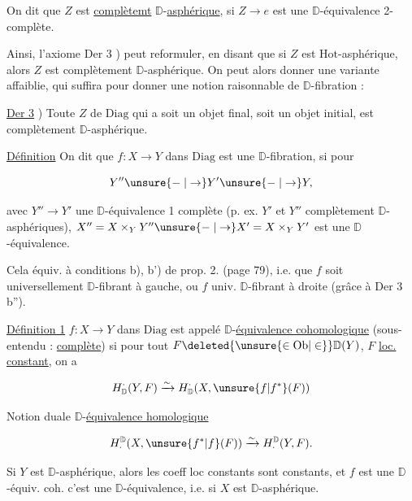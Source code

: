 
On dit que $Z$ est \uline{complètemt} $\mathbb D$-\uline{asphérique}, si $Z\longrightarrow e$ est une $\mathbb D$-équivalence 2-complète.

Ainsi, l'axiome Der 3 ) peut  reformuler, en disant que si $Z$ est $\mathrm{Hot}$-asphérique, alors $Z$ est complètement $\mathbb D$-asphérique. On peut alors donner une variante affaiblie, qui suffira pour donner une notion raisonnable de $\mathbb D$-fibration :


\uline{Der 3} ) Toute $Z$ de $\mathrm{Diag}$ qui a soit un objet final, soit un objet initial, est complètement $\mathbb D$-asphérique.

\uline{Définition} On dit que $f:X\to Y$ dans $\mathrm{Diag}$ est une $\mathbb D$-fibration, si pour

\[
Y''\unsure{\relbar|\to}Y'\unsure{\relbar|\to}Y,
\]

avec $Y''\to Y'$  une $\mathbb D$-équivalence 1 complète (p. ex. $Y'$ et $Y''$ complètement $\mathbb D$-asphériques), $X''=X\times_Y Y''\unsure{\relbar|\to}X'=X\times_Y Y'$ est une $\mathbb D$-équivalence.

Cela équiv. à  conditions b), b') de prop. 2. (page 79), i.e. que $f$ soit universellement $\mathbb D$-fibrant à gauche, ou $f$ univ. $\mathbb D$-fibrant à droite (grâce à Der 3 b'').


\uline{Définition 1} $f:X\to Y$ dans $\mathrm{Diag}$ est appelé $\mathbb D$-\uline{équivalence cohomologique} (sous-entendu : \uline{complète}) si pour tout $F\deleted{\unsure{\in\mathrm{Ob}|\in}}\mathbb D(Y)$, $F$ \uline{loc. constant}, on a

\[
H^{\cdot}_{\mathbb D}(Y,F)\xrightarrow{\sim} H^{\cdot}_{\mathbb D}(X,\unsure{f|f^*}(F))
\]

Notion duale $\mathbb D$-\uline{équivalence homologique}

\[
H^{\mathbb D}_{\cdot}(X,\unsure{f^*|f}(F))\xrightarrow{\sim}H^{\mathbb D}_{\cdot}(Y,F).
\]

Si $Y$ est  $\mathbb D$-asphérique, alors les coeff loc constants  sont constants, et $f$ est une $\mathbb D$-équiv. coh.   c'est une $\mathbb D$-équivalence, i.e. si $X$ est $\mathbb D$-asphérique.

